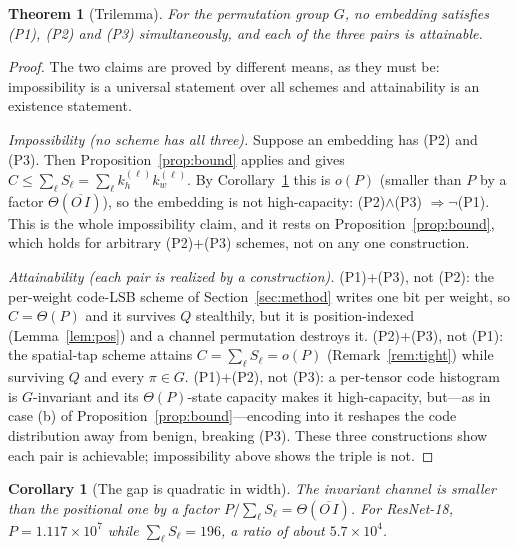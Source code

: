 \documentclass[10pt,journal]{IEEEtran}
\newtheorem{theorem}{Theorem}
\newtheorem{corollary}{Corollary}
\theoremstyle{remark}
\begin{document}
\begin{theorem}[Trilemma]\label{thm:tri}
For the permutation group $G$, no embedding satisfies \textup{(P1)}, \textup{(P2)} and
\textup{(P3)} simultaneously, and each of the three pairs is attainable.
\end{theorem}
\begin{proof}
The two claims are proved by different means, as they must be: impossibility is a universal
statement over all schemes and attainability is an existence statement.

\emph{Impossibility (no scheme has all three).} Suppose an embedding has \textup{(P2)} and
\textup{(P3)}. Then Proposition~\ref{prop:bound} applies and gives
$C\le\sum_\ell S_\ell=\sum_\ell k_h^{(\ell)}k_w^{(\ell)}$. By Corollary~\ref{cor:gap} this is
$o(P)$ (smaller than $P$ by a factor $\Theta(\overline{O\,I})$), so the embedding is not
high-capacity: \textup{(P2)}$\wedge$\textup{(P3)} $\Rightarrow\neg$\textup{(P1)}. This is the
whole impossibility claim, and it rests on Proposition~\ref{prop:bound}, which holds for
arbitrary \textup{(P2)}+\textup{(P3)} schemes, not on any one construction.

\emph{Attainability (each pair is realized by a construction).} \textup{(P1)}+\textup{(P3)},
not \textup{(P2)}: the per-weight code-LSB scheme of Section~\ref{sec:method} writes one bit
per weight, so $C=\Theta(P)$ and it survives $Q$ stealthily, but it is position-indexed
(Lemma~\ref{lem:pos}) and a channel permutation destroys it. \textup{(P2)}+\textup{(P3)}, not
\textup{(P1)}: the spatial-tap scheme attains $C=\sum_\ell S_\ell=o(P)$ (Remark~\ref{rem:tight})
while surviving $Q$ and every $\pi\in G$. \textup{(P1)}+\textup{(P2)}, not \textup{(P3)}: a
per-tensor code histogram is $G$-invariant and its $\Theta(P)$-state capacity makes it
high-capacity, but---as in case (b) of Proposition~\ref{prop:bound}---encoding into it reshapes
the code distribution away from benign, breaking \textup{(P3)}. These three constructions show
each pair is achievable; impossibility above shows the triple is not.
\end{proof}

\begin{corollary}[The gap is quadratic in width]\label{cor:gap}
The invariant channel is smaller than the positional one by a factor
$P/\sum_\ell S_\ell=\Theta(\overline{O\,I})$. For ResNet-18, $P=1.117\times10^{7}$ while
$\sum_\ell S_\ell=196$, a ratio of about $5.7\times10^{4}$.
\end{corollary}
\end{document}
